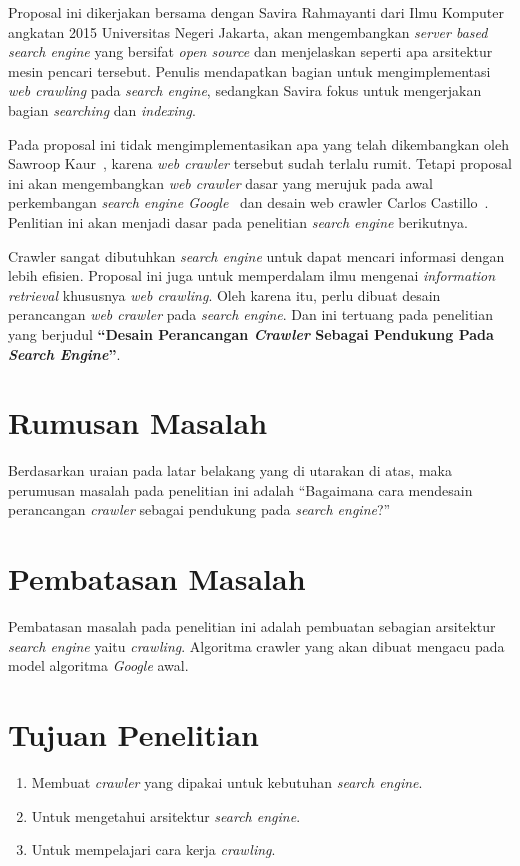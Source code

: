 
Proposal ini dikerjakan bersama dengan Savira Rahmayanti dari Ilmu Komputer angkatan 2015 Universitas Negeri Jakarta, akan mengembangkan \emph{server based search engine} yang bersifat \emph{open source} dan menjelaskan seperti apa arsitektur mesin pencari tersebut. Penulis mendapatkan bagian untuk mengimplementasi \emph{web crawling} pada \emph{search engine}, sedangkan Savira fokus untuk mengerjakan bagian \emph{searching} dan \emph{indexing}.

Pada proposal ini tidak mengimplementasikan apa yang telah dikembangkan oleh Sawroop Kaur~\cite{kaur2020simhar}, karena \emph{web crawler} tersebut sudah terlalu rumit. Tetapi proposal ini akan mengembangkan \emph{web crawler} dasar yang merujuk pada awal perkembangan \emph{search engine Google}~\cite{brin1998anatomy} dan desain web crawler Carlos Castillo~\cite{castillo2005effective}. Penlitian ini akan menjadi dasar pada penelitian \emph{search engine} berikutnya.

Crawler sangat dibutuhkan \emph{search engine} untuk dapat mencari informasi dengan lebih efisien. Proposal ini juga untuk memperdalam ilmu mengenai \emph{information retrieval} khususnya \emph{web crawling}. Oleh karena itu, perlu dibuat desain perancangan \emph{web crawler} pada \emph{search engine}. Dan ini tertuang pada penelitian yang berjudul \textbf{“Desain Perancangan \emph{Crawler} Sebagai Pendukung Pada \emph{Search Engine}”}.




\section{Rumusan Masalah}
Berdasarkan uraian pada latar belakang yang di utarakan di atas, maka perumusan masalah pada penelitian ini adalah “Bagaimana cara mendesain perancangan \emph{crawler} sebagai pendukung pada \emph{search engine}?”

\section{Pembatasan Masalah}
Pembatasan masalah pada penelitian ini adalah pembuatan sebagian arsitektur \emph{search engine} yaitu \emph{crawling}. Algoritma crawler yang akan dibuat mengacu pada model algoritma \emph{Google} awal.

\section{Tujuan Penelitian}
\begin{enumerate}
	\item Membuat \emph{crawler} yang dipakai untuk kebutuhan \emph{search engine}.
	\item Untuk mengetahui arsitektur \emph{search engine}.
	\item Untuk mempelajari cara kerja \emph{crawling}.
\end{enumerate}

